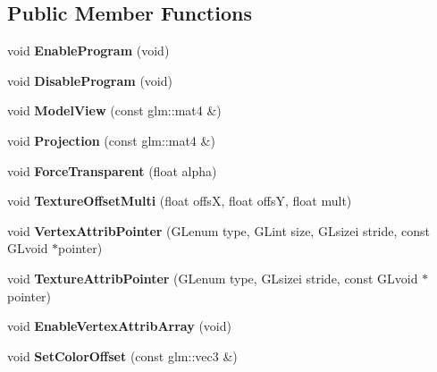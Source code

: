 \subsection*{\-Public \-Member \-Functions}
\begin{DoxyCompactItemize}
\item 
\hypertarget{classSimpleTextureShader_ab1337699a07b0d95800759fa41b3dfc8}{void {\bfseries \-Enable\-Program} (void)}\label{classSimpleTextureShader_ab1337699a07b0d95800759fa41b3dfc8}

\item 
\hypertarget{classSimpleTextureShader_ac9d95b1a26fd58fea2ec8d2c4d4667e8}{void {\bfseries \-Disable\-Program} (void)}\label{classSimpleTextureShader_ac9d95b1a26fd58fea2ec8d2c4d4667e8}

\item 
\hypertarget{classSimpleTextureShader_a7af7836bf457cbe958921b5de9661393}{void {\bfseries \-Model\-View} (const glm\-::mat4 \&)}\label{classSimpleTextureShader_a7af7836bf457cbe958921b5de9661393}

\item 
\hypertarget{classSimpleTextureShader_a71c5348917015943eb937dab9e75f2bc}{void {\bfseries \-Projection} (const glm\-::mat4 \&)}\label{classSimpleTextureShader_a71c5348917015943eb937dab9e75f2bc}

\item 
\hypertarget{classSimpleTextureShader_a748c23e2920a3aabf5abaa9cf93c8629}{void {\bfseries \-Force\-Transparent} (float alpha)}\label{classSimpleTextureShader_a748c23e2920a3aabf5abaa9cf93c8629}

\item 
\hypertarget{classSimpleTextureShader_a907cc0a6b3aac300471f731df1025625}{void {\bfseries \-Texture\-Offset\-Multi} (float offs\-X, float offs\-Y, float mult)}\label{classSimpleTextureShader_a907cc0a6b3aac300471f731df1025625}

\item 
\hypertarget{classSimpleTextureShader_a76e795f797d5f866fea98d5e086fd9cf}{void {\bfseries \-Vertex\-Attrib\-Pointer} (\-G\-Lenum type, \-G\-Lint size, \-G\-Lsizei stride, const \-G\-Lvoid $\ast$pointer)}\label{classSimpleTextureShader_a76e795f797d5f866fea98d5e086fd9cf}

\item 
\hypertarget{classSimpleTextureShader_a805595227822d5e9ae6467a0de626676}{void {\bfseries \-Texture\-Attrib\-Pointer} (\-G\-Lenum type, \-G\-Lsizei stride, const \-G\-Lvoid $\ast$pointer)}\label{classSimpleTextureShader_a805595227822d5e9ae6467a0de626676}

\item 
\hypertarget{classSimpleTextureShader_ac2167e75a43cd85f3dc89a8fbcfccd09}{void {\bfseries \-Enable\-Vertex\-Attrib\-Array} (void)}\label{classSimpleTextureShader_ac2167e75a43cd85f3dc89a8fbcfccd09}

\item 
\hypertarget{classSimpleTextureShader_a360a4935810670114fab3916c7af42ae}{void {\bfseries \-Set\-Color\-Offset} (const glm\-::vec3 \&)}\label{classSimpleTextureShader_a360a4935810670114fab3916c7af42ae}

\end{DoxyCompactItemize}
